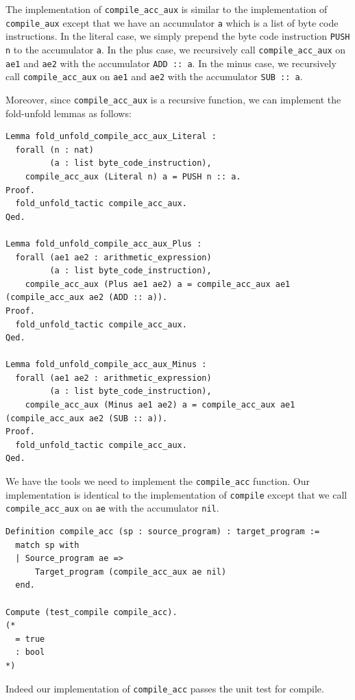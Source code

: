 \documentclass{article}
\begin{document}
The implementation of \texttt{compile\_acc\_aux} is similar to the implementation of \texttt{compile\_aux} except that we have an accumulator \texttt{a} which is a list of byte code instructions. In the literal case, we simply prepend the byte code instruction \texttt{PUSH n} to the accumulator \texttt{a}. In the plus case, we recursively call \texttt{compile\_acc\_aux} on \texttt{ae1} and \texttt{ae2} with the accumulator \texttt{ADD :: a}. In the minus case, we recursively call \texttt{compile\_acc\_aux} on \texttt{ae1} and \texttt{ae2} with the accumulator \texttt{SUB :: a}.

Moreover, since \texttt{compile\_acc\_aux} is a recursive function, we can implement the fold-unfold lemmas as follows:

\begin{lstlisting}
Lemma fold_unfold_compile_acc_aux_Literal :
  forall (n : nat)
         (a : list byte_code_instruction),
    compile_acc_aux (Literal n) a = PUSH n :: a.
Proof.
  fold_unfold_tactic compile_acc_aux.
Qed.

Lemma fold_unfold_compile_acc_aux_Plus :
  forall (ae1 ae2 : arithmetic_expression)
         (a : list byte_code_instruction),
    compile_acc_aux (Plus ae1 ae2) a = compile_acc_aux ae1 (compile_acc_aux ae2 (ADD :: a)).
Proof.
  fold_unfold_tactic compile_acc_aux.
Qed.

Lemma fold_unfold_compile_acc_aux_Minus :
  forall (ae1 ae2 : arithmetic_expression)
         (a : list byte_code_instruction),
    compile_acc_aux (Minus ae1 ae2) a = compile_acc_aux ae1 (compile_acc_aux ae2 (SUB :: a)).
Proof.
  fold_unfold_tactic compile_acc_aux.
Qed.
\end{lstlisting}

We have the tools we need to implement the \texttt{compile\_acc} function. Our implementation is identical to the implementation of \texttt{compile} except that we call \texttt{compile\_acc\_aux} on \texttt{ae} with the accumulator \texttt{nil}.

\begin{lstlisting}
Definition compile_acc (sp : source_program) : target_program :=
  match sp with
  | Source_program ae =>
      Target_program (compile_acc_aux ae nil)
  end.

Compute (test_compile compile_acc).
(*
  = true
  : bool
*)
\end{lstlisting}

Indeed our implementation of \texttt{compile\_acc} passes the unit test for compile.
\end{document}
